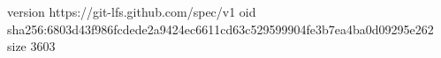 version https://git-lfs.github.com/spec/v1
oid sha256:6803d43f986fcdede2a9424ec6611cd63c529599904fe3b7ea4ba0d09295e262
size 3603
